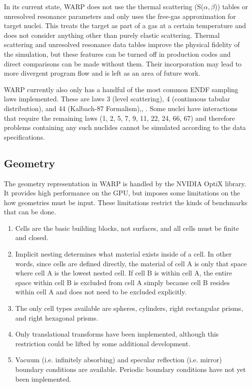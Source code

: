 \documentclass[preprint,12pt]{elsarticle}
\begin{document}
In its current state, WARP does not use the thermal scattering (S($\alpha,$$\beta$)) tables or unresolved resonance parameters and only uses the free-gas approximation for target nuclei.  This treats the target as part of a gas at a certain temperature and does not consider anything other than purely elastic scattering. Thermal scattering and unresolved resonance data tables improve the physical fidelity of the simulation, but these features can be turned off in production codes and direct comparisons can be made without them.  Their incorporation may lead to more divergent program flow and is left as an area of future work.

WARP currently also only has a handful of the most common ENDF sampling laws implemented.   These are laws 3 (level scattering), 4 (continuous tabular distribution), and 44 (Kalbach-87 Formalism),, \cite{MCNP}.  Some nuclei have interactions that require the remaining laws (1, 2, 5, 7, 9, 11, 22, 24, 66, 67) and therefore problems containing any such nuclides cannot be simulated according to the data specifications.

\subsection{Geometry}

The geometry representation in WARP is handled by the NVIDIA OptiX library.  It provides high performance on the GPU, but imposes some limitations on the how geometries must be input.  These limitations restrict the kinds of benchmarks that can be done.

\begin{enumerate}
\item Cells are the basic building blocks, not surfaces, and all cells must be finite and closed.
\item Implicit nesting determines what material exists inside of a cell.  In other words, since cells are defined directly, the material of cell A is only that space where cell A is the lowest nested cell.  If cell B is within cell A, the entire space within cell B is excluded from cell A simply because cell B resides within cell A and does not need to be excluded explicitly.
\item The only cell types available are spheres, cylinders, right rectangular prisms, and right hexagonal prisms.
\item Only translational transforms have been implemented, although this restriction could be lifted by some additional development.
\item Vacuum (i.e. infinitely absorbing) and specular reflection  (i.e. mirror) boundary conditions are available.  Periodic boundary conditions have not yet been implemented.
\end{enumerate}
\end{document}
